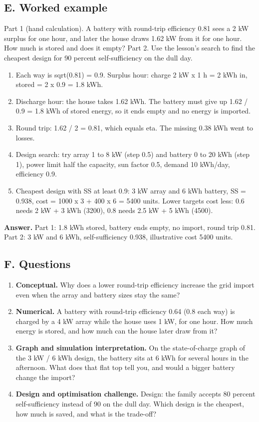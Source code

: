 \documentclass[11pt,a4paper]{article}
\begin{document}
\subsection*{E. Worked example}
Part 1 (hand calculation). A battery with round-trip efficiency 0.81 sees a 2 kW surplus for one hour, and later the house draws 1.62 kW from it for one hour. How much is stored and does it empty? Part 2. Use the lesson's search to find the cheapest design for 90 percent self-sufficiency on the dull day.
\begin{enumerate}[nosep]
\item Each way is sqrt(0.81) = 0.9. Surplus hour: charge 2 kW x 1 h = 2 kWh in, stored = 2 x 0.9 = 1.8 kWh.
\item Discharge hour: the house takes 1.62 kWh. The battery must give up 1.62 / 0.9 = 1.8 kWh of stored energy, so it ends empty and no energy is imported.
\item Round trip: 1.62 / 2 = 0.81, which equals eta. The missing 0.38 kWh went to losses.
\item Design search: try array 1 to 8 kW (step 0.5) and battery 0 to 20 kWh (step 1), power limit half the capacity, sun factor 0.5, demand 10 kWh/day, efficiency 0.9.
\item Cheapest design with SS at least 0.9: 3 kW array and 6 kWh battery, SS = 0.938, cost = 1000 x 3 + 400 x 6 = 5400 units. Lower targets cost less: 0.6 needs 2 kW + 3 kWh (3200), 0.8 needs 2.5 kW + 5 kWh (4500).
\end{enumerate}
\textbf{Answer.} Part 1: 1.8 kWh stored, battery ends empty, no import, round trip 0.81. Part 2: 3 kW and 6 kWh, self-sufficiency 0.938, illustrative cost 5400 units.

\subsection*{F. Questions}
\begin{enumerate}[nosep]
\item \textbf{Conceptual.} Why does a lower round-trip efficiency increase the grid import even when the array and battery sizes stay the same?
\item \textbf{Numerical.} A battery with round-trip efficiency 0.64 (0.8 each way) is charged by a 4 kW array while the house uses 1 kW, for one hour. How much energy is stored, and how much can the house later draw from it?
\item \textbf{Graph and simulation interpretation.} On the state-of-charge graph of the 3 kW / 6 kWh design, the battery sits at 6 kWh for several hours in the afternoon. What does that flat top tell you, and would a bigger battery change the import?
\item \textbf{Design and optimisation challenge.} Design: the family accepts 80 percent self-sufficiency instead of 90 on the dull day. Which design is the cheapest, how much is saved, and what is the trade-off?
\end{enumerate}
\end{document}
